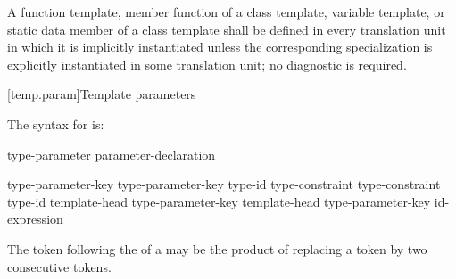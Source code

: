 \pnum
A function template, member function of a class template, variable template,
or static data
member of a class template shall be defined in every translation unit in
which it is implicitly instantiated unless the
corresponding specialization is explicitly instantiated
in some translation unit; no diagnostic is required.

[temp.param]{Template parameters}

\pnum
The syntax for
is:

\begin{bnf}
\br
  type-parameter\br
  parameter-declaration
\end{bnf}

\begin{bnf}
\br
  type-parameter-key  \br
  type-parameter-key  \terminal{=} type-id\br
  type-constraint  \br
  type-constraint  \terminal{=} type-id\br
  template-head type-parameter-key  \br
  template-head type-parameter-key  \terminal{=} id-expression
\end{bnf}

\begin{bnf}
\br
  \br
\end{bnf}

\begin{note} The \tcode{>} token following the
 of a
may be the product of replacing a
\tcode{>{>}} token by two consecutive \tcode{>}
tokens.\end{note}

